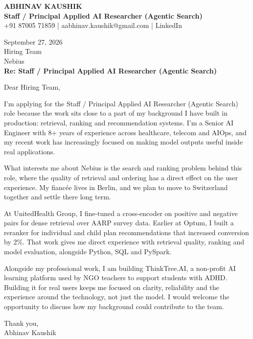 \documentclass[10pt,a4paper]{article}
\begin{document}
\begin{center}
{\Large\bfseries ABHINAV KAUSHIK}\\[2pt]
{\bfseries Staff / Principal Applied AI Researcher (Agentic Search)}\\[2pt]
+91 87005 71859 \quad | \quad aabhinav.kaushik@gmail.com \quad | \quad LinkedIn
\end{center}
\vspace{8pt}
September 27, 2026\\[6pt]
Hiring Team\\
Nebius\\[4pt]
\textbf{Re: Staff / Principal Applied AI Researcher (Agentic Search)}

Dear Hiring Team,

I’m applying for the Staff / Principal Applied AI Researcher (Agentic Search) role because the work sits close to a part of my background I have built in production: retrieval, ranking and recommendation systems. I’m a Senior AI Engineer with 8+ years of experience across healthcare, telecom and AIOps, and my recent work has increasingly focused on making model outputs useful inside real applications.

What interests me about Nebius is the search and ranking problem behind this role, where the quality of retrieval and ordering has a direct effect on the user experience. My fiancée lives in Berlin, and we plan to move to Switzerland together and settle there long term.

At UnitedHealth Group, I fine-tuned a cross-encoder on positive and negative pairs for dense retrieval over AARP survey data. Earlier at Optum, I built a reranker for individual and child plan recommendations that increased conversion by 2\%. That work gives me direct experience with retrieval quality, ranking and model evaluation, alongside Python, SQL and PySpark.

Alongside my professional work, I am building ThinkTree.AI, a non-profit AI learning platform used by NGO teachers to support students with ADHD. Building it for real users keeps me focused on clarity, reliability and the experience around the technology, not just the model. I would welcome the opportunity to discuss how my background could contribute to the team.

Thank you,\\
Abhinav Kaushik
\end{document}
